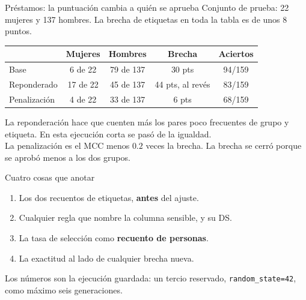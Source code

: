 \documentclass[aspectratio=169,11pt]{beamer}
\begin{document}
\begin{frame}{Préstamos: la puntuación cambia a quién se aprueba}
  Conjunto de prueba: 22 mujeres y 137 hombres. La brecha de etiquetas en toda la tabla es de unos 8 puntos.
  \vspace{0.3em}

  \small
  \renewcommand{\arraystretch}{1.18}
  \begin{tabular}{@{}l c c c c@{}}
    \toprule
     & Mujeres & Hombres & Brecha & Aciertos \\
    \midrule
    Base & 6 de 22 & 79 de 137 & 30 pts & 94/159 \\
    Reponderado & 17 de 22 & 45 de 137 & 44 pts, al revés & 83/159 \\
    Penalización & 4 de 22 & 33 de 137 & 6 pts & 68/159 \\
    \bottomrule
  \end{tabular}

  \vspace{0.35em}
  {\small La reponderación hace que cuenten más los pares poco frecuentes de grupo y etiqueta. En esta ejecución corta se pasó de la igualdad.\\
  La penalización es el MCC menos \(0.2\) veces la brecha. La brecha se cerró porque se aprobó menos a los dos grupos.}
\end{frame}

\begin{frame}{Cuatro cosas que anotar}
  \begin{enumerate}
    \item Los dos recuentos de etiquetas, \textbf{antes} del ajuste.
    \item Cualquier regla que nombre la columna sensible, y su DS.
    \item La tasa de selección como \textbf{recuento de personas}.
    \item La exactitud al lado de cualquier brecha nueva.
  \end{enumerate}
  \vfill
  {\small\color{ebdmuted}Los números son la ejecución guardada: un tercio reservado, \texttt{random\_state=42}, como máximo seis generaciones.}
\end{frame}
\end{document}
